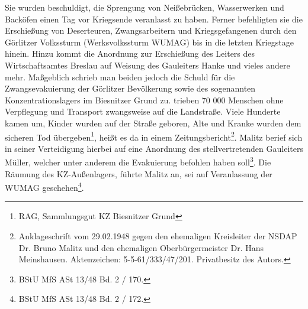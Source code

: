 \documentclass[a4paper,12pt,ngerman,
]{nisebook}
\begin{document}
Sie wurden beschuldigt, die Sprengung von Neißebrücken, Wasserwerken und Backöfen einen Tag vor Kriegsende veranlasst zu haben. Ferner befehligten sie die Erschießung von Deserteuren, Zwangsarbeitern und Kriegsgefangenen durch den Görlitzer Volkssturm (Werksvolkssturm WUMAG) bis in die letzten Kriegstage hinein. Hinzu kommt die Anordnung zur Erschießung des Leiters des Wirtschaftsamtes Breslau auf Weisung des Gauleiters Hanke und vieles andere mehr.
Maßgeblich schrieb man beiden jedoch die Schuld für die Zwangsevakuierung der Görlitzer Bevölkerung sowie des sogenannten Konzentrationslagers im Biesnitzer Grund zu. \glqq [Sie] trieben 70 000 Menschen ohne Verpflegung und Transport zwangsweise auf die Landstraße. Viele Hunderte kamen um, Kinder wurden auf der Straße geboren, Alte und Kranke wurden dem sicheren Tod übergeben\grqq\footnote{RAG, Sammlungsgut KZ Biesnitzer Grund}, heißt es da in einem Zeitungsbericht\footnote{Anklageschrift vom 29.02.1948 gegen den ehemaligen Kreisleiter der NSDAP Dr. Bruno Malitz und den ehemaligen Oberbürgermeister Dr. Hans Meinshausen. Aktenzeichen: 5-5-61/333/47/201. Privatbesitz des Autors.}. Malitz berief sich in seiner Verteidigung hierbei auf eine Anordnung des stellvertretenden Gauleiters Müller, welcher unter anderem die Evakuierung befohlen haben soll\footnote{BStU MfS ASt 13/48 Bd. 2 / 170.}. Die Räumung des KZ-Außenlagers, führte Malitz an, sei auf Veranlassung der WUMAG geschehen\footnote{BStU MfS ASt 13/48 Bd. 2 / 172.}.\newline 
\end{document}
